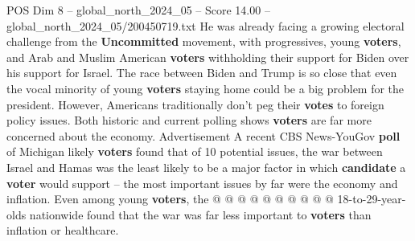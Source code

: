 \begin{textsample}{POS Dim 8 – global\_north\_2024\_05 – Score 14.00 – global\_north\_2024\_05/200450719.txt}
He was already facing a growing electoral challenge from the \textbf{Uncommitted} movement, with progressives, young \textbf{voters}, and Arab and Muslim American \textbf{voters} withholding their support for Biden over his support for Israel.
The race between Biden and Trump is so close that even the vocal minority of young \textbf{voters} staying home could be a big problem for the president.
However, Americans traditionally don't peg their \textbf{votes} to foreign policy issues.
Both historic and current polling shows \textbf{voters} are far more concerned about the economy.
Advertisement A recent CBS News-YouGov \textbf{poll} of Michigan likely \textbf{voters} found that of 10 potential issues, the war between Israel and Hamas was the least likely to be a major factor in which \textbf{candidate} a \textbf{voter} would support -- the most important issues by far were the economy and inflation.
Even among young \textbf{voters}, the @ @ @ @ @ @ @ @ @ @ 18-to-29-year-olds nationwide found that the war was far less important to \textbf{voters} than inflation or healthcare.

\end{textsample}
